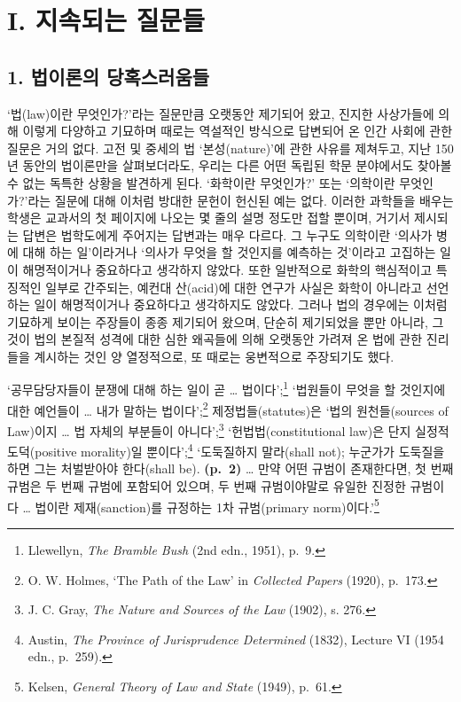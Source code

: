 \section{I. 지속되는
질문들}\label{i.-uxc9c0uxc18duxb418uxb294-uxc9c8uxbb38uxb4e4}

\subsection{1. 법이론의
당혹스러움들}\label{uxbc95uxc774uxb860uxc758-uxb2f9uxd639uxc2a4uxb7ecuxc6c0uxb4e4}

‘법(law)이란 무엇인가?’라는 질문만큼 오랫동안 제기되어 왔고, 진지한
사상가들에 의해 이렇게 다양하고 기묘하며 때로는 역설적인 방식으로
답변되어 온 인간 사회에 관한 질문은 거의 없다. 고전 및 중세의 법
‘본성(nature)’에 관한 사유를 제쳐두고, 지난 150년 동안의 법이론만을
살펴보더라도, 우리는 다른 어떤 독립된 학문 분야에서도 찾아볼 수 없는
독특한 상황을 발견하게 된다. ‘화학이란 무엇인가?’ 또는 ‘의학이란
무엇인가?’라는 질문에 대해 이처럼 방대한 문헌이 헌신된 예는 없다. 이러한
과학들을 배우는 학생은 교과서의 첫 페이지에 나오는 몇 줄의 설명 정도만
접할 뿐이며, 거기서 제시되는 답변은 법학도에게 주어지는 답변과는 매우
다르다. 그 누구도 의학이란 ‘의사가 병에 대해 하는 일’이라거나 ‘의사가
무엇을 할 것인지를 예측하는 것’이라고 고집하는 일이 해명적이거나
중요하다고 생각하지 않았다. 또한 일반적으로 화학의 핵심적이고 특징적인
일부로 간주되는, 예컨대 산(acid)에 대한 연구가 사실은 화학이 아니라고
선언하는 일이 해명적이거나 중요하다고 생각하지도 않았다. 그러나 법의
경우에는 이처럼 기묘하게 보이는 주장들이 종종 제기되어 왔으며, 단순히
제기되었을 뿐만 아니라, 그것이 법의 본질적 성격에 대한 심한 왜곡들에
의해 오랫동안 가려져 온 법에 관한 진리들을 계시하는 것인 양 열정적으로,
또 때로는 웅변적으로 주장되기도 했다.

‘공무담당자들이 분쟁에 대해 하는 일이 곧 \ldots{} 법이다’;\footnote{Llewellyn,
  \emph{The Bramble Bush} (2nd edn., 1951), p.~9.} ‘법원들이 무엇을 할
것인지에 대한 예언들이 \ldots{} 내가 말하는 법이다’;\footnote{O. W.
  Holmes, `The Path of the Law' in \emph{Collected Papers} (1920),
  p.~173.} 제정법들(statutes)은 ‘법의 원천들(sources of Law)이지
\ldots{} 법 자체의 부분들이 아니다’;\footnote{J. C. Gray, \emph{The
  Nature and Sources of the Law} (1902), s. 276.} ‘헌법법(constitutional
law)은 단지 실정적 도덕(positive morality)일 뿐이다’;\footnote{Austin,
  \emph{The Province of Jurisprudence Determined} (1832), Lecture VI
  (1954 edn., p.~259).} ‘도둑질하지 말라(shall not); 누군가가 도둑질을
하면 그는 처벌받아야 한다(shall be). \textbf{(p.~2)} \ldots{} 만약 어떤
규범이 존재한다면, 첫 번째 규범은 두 번째 규범에 포함되어 있으며, 두
번째 규범이야말로 유일한 진정한 규범이다 \ldots{} 법이란
제재(sanction)를 규정하는 1차 규범(primary norm)이다.’\footnote{Kelsen,
  \emph{General Theory of Law and State} (1949), p.~61.}

